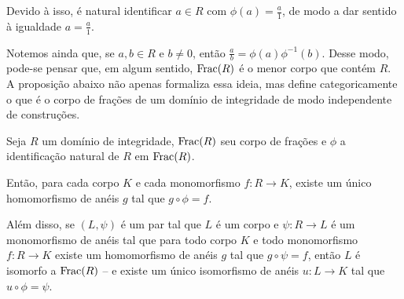 Devido à isso, é natural identificar $a \in R$ com $\phi(a)=\frac{a}{1}$, de modo a dar sentido à igualdade $a=\frac{a}{1}$.

Notemos ainda que, se $a, b\in R$ e $b\neq 0$, então $\frac{a}{b}=\phi(a)\phi^{-1}(b)$.
Desse modo, pode-se pensar que, em algum sentido, $\operatorname{Frac}(R)$ é o menor corpo que contém $R$.
A proposição abaixo não apenas formaliza essa ideia, mas define categoricamente o que é o corpo de frações de um domínio de integridade de modo independente de construções.

\begin{theorem}
    Seja $R$ um domínio de integridade, $\operatorname{Frac}(R)$ seu corpo de frações e $\phi$ a identificação natural de $R$ em $\operatorname{Frac}(R)$.

    Então, para cada corpo $K$ e cada monomorfismo $f:R\rightarrow K$, existe um único homomorfismo de anéis $g$ tal que $g\circ\phi=f$.

    Além disso, se $(L, \psi)$ é um par tal que $L$ é um corpo e $\psi:R\rightarrow L$ é um monomorfismo de anéis tal que para todo corpo $K$ e todo monomorfismo $f:R\rightarrow K$ existe um homomorfismo de anéis $g$ tal que $g\circ\psi=f$, então $L$ é isomorfo a $\operatorname{Frac}(R)$ -- e existe um único isomorfismo de anéis $u:L\rightarrow K$ tal que $u\circ\phi=\psi$.
\end{theorem}

